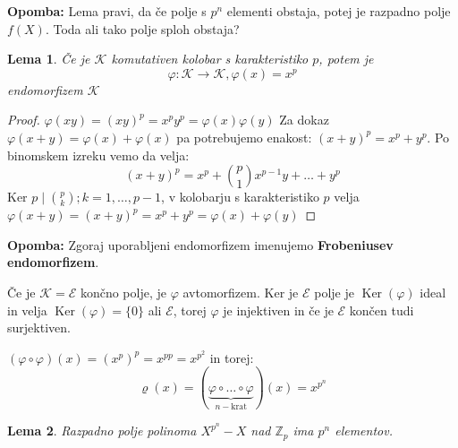 \documentclass[a4paper]{article}
\newcounter{environment:definition_counter}
\newcounter{environment:theorem_counter}
\newcounter{environment:statement_counter}
\newenvironment{remark}
{\textbf{Opomba:}}
{}
\newtheorem{lemma}{Lema}
\renewcommand{\ker}{\ensuremath{\operatorname{Ker}}} %
\begin{document}
\begin{remark}
Lema pravi, da če polje s $p^n$ elementi obstaja, potej je razpadno polje $f(X)$. Toda ali tako polje sploh obstaja?
\end{remark}


\begin{lemma}
Če je $\mathcal{K}$ komutativen kolobar s karakteristiko $p$, potem je
$$\varphi : \mathcal{K} \to \mathcal{K}, \varphi(x) = x^p$$
endomorfizem $\mathcal{K}$
\end{lemma}

\begin{proof}
$\varphi(xy) = (xy)^p = x^py^p = \varphi(x)\varphi(y)$
Za dokaz $\varphi(x+y) = \varphi(x) + \varphi(x)$ pa potrebujemo enakost: $(x+y)^p = x^p + y^p$. Po binomskem izreku vemo da velja: 
$$(x+y)^p = x^p + \binom{p}{1}x^{p-1}y + \dots + y^p$$
Ker $p \mid \binom{p}{k}; k =1, \dots, p-1$, v kolobarju s karakteristiko $p$ velja $\varphi(x+y) = (x+y)^p = x^p + y^p = \varphi(x) + \varphi(y)$
\end{proof}


\begin{remark}
Zgoraj uporabljeni endomorfizem imenujemo \textbf{Frobeniusev endomorfizem}.
\end{remark}

Če je $\mathcal{K} = \mathcal{E}$ končno polje, je $\varphi$ avtomorfizem. 
Ker je $\mathcal{E}$ polje je $\ker(\varphi)$ ideal in velja $\ker(\varphi) = \{0\}$ ali $\mathcal{E}$, torej $\varphi$ je injektiven in če je $\mathcal{E}$ končen tudi surjektiven.

$(\varphi \circ \varphi)(x) = (x^p)^p = x^{pp} = x^{p^2}$ in torej:
$$\varrho(x) = (\underbrace{\varphi \circ \dots \circ \varphi}_{n-\text{krat}})(x) = x^{p^n}$$

\begin{lemma}
Razpadno polje polinoma $X^{p^n} - X $ nad $\mathbb{Z}_p$ ima $p^n$ elementov.
\end{lemma}
\end{document}
